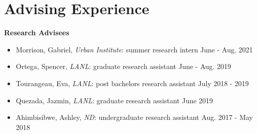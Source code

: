\documentclass[11pt, letterpaper, roman]{moderncv} %
\begin{document}
\section{Advising Experience}

\textbf{Research Advisees}

\small
    \begin{itemize}
        \item Morrison, Gabriel, \textit{Urban Institute}: summer research intern \hfill June - Aug. 2021
        \item Ortega, Spencer, \textit{LANL}: graduate research assistant \hfill June - Aug. 2019
        \item Tourangeau, Eva, \textit{LANL}: post bachelors research assistant \hfill July 2018 - 2019
        \item Quezada, Jazmin, \textit{LANL}: graduate research assistant \hfill June 2019
        \item Ahimbisibwe, Ashley, \textit{ND}: undergraduate research assistant \hfill Aug. 2017 - May 2018
    \end{itemize}
\normalsize
\end{document}
